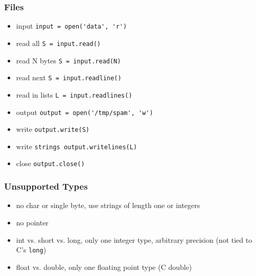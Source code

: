 \begin{frame}[fragile]\frametitle{Files}
  \begin{itemize}
  \item input \lstinline{input = open('data', 'r')}
  \item read all \lstinline{S = input.read()}
  \item read N bytes \lstinline{S = input.read(N)}
  \item read next \lstinline{S = input.readline()}
  \item read in lists \lstinline{L = input.readlines()}
  \item output \lstinline{output = open('/tmp/spam', 'w')}
  \item write \lstinline{output.write(S)}
  \item write \lstinline{strings output.writelines(L)}
  \item close \lstinline{output.close()}
  \end{itemize}
\end{frame}


\begin{frame}[fragile]\frametitle{Unsupported Types}
  \begin{itemize}
  \item no char or single byte, use strings of length one or integers
  \item no pointer
  \item int vs. short vs. long, only one integer type, arbitrary precision (not tied to C's \lstinline{long})
  \item float vs. double, only one floating point type (C double)
  \end{itemize}
\end{frame}

